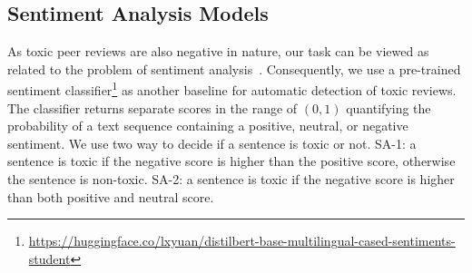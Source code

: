 \subsection{Sentiment Analysis Models} 

As toxic peer reviews are also negative in nature, our task can be viewed as related to the problem of sentiment analysis~\cite{socher2013recursive}.
Consequently, we use a pre-trained sentiment classifier\footnote{\url{https://huggingface.co/lxyuan/distilbert-base-multilingual-cased-sentiments-student}} as another baseline for automatic detection of toxic reviews. The classifier returns separate scores in the range of $(0,1)$ quantifying the probability of a text sequence containing a positive, neutral, or negative sentiment. 
We use two way to decide if a sentence is toxic or not. 
SA-1: a sentence is toxic if the negative score is higher than the positive score, otherwise the sentence is non-toxic. 
SA-2:  a sentence is toxic if the negative score is higher than both positive and neutral score.







